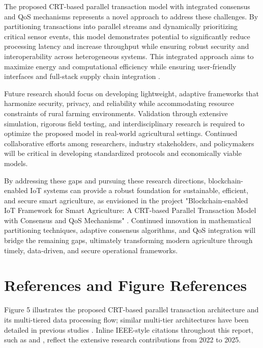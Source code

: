 \documentclass[12pt,onecolumn]{IEEEtran} %
\begin{document}
The proposed CRT-based parallel transaction model with integrated consensus and QoS mechanisms represents a novel approach to address these challenges. By partitioning transactions into parallel streams and dynamically prioritizing critical sensor events, this model demonstrates potential to significantly reduce processing latency and increase throughput while ensuring robust security and interoperability across heterogeneous systems. This integrated approach aims to maximize energy and computational efficiency while ensuring user-friendly interfaces and full-stack supply chain integration \cite{thiruvenkatasamy2025anonlinetool, singh2025blockchainandflbased}.

Future research should focus on developing lightweight, adaptive frameworks that harmonize security, privacy, and reliability while accommodating resource constraints of rural farming environments. Validation through extensive simulation, rigorous field testing, and interdisciplinary research is required to optimize the proposed model in real-world agricultural settings. Continued collaborative efforts among researchers, industry stakeholders, and policymakers will be critical in developing standardized protocols and economically viable models.

By addressing these gaps and pursuing these research directions, blockchain-enabled IoT systems can provide a robust foundation for sustainable, efficient, and secure smart agriculture, as envisioned in the project "Blockchain-enabled IoT Framework for Smart Agriculture: A CRT-based Parallel Transaction Model with Consensus and QoS Mechanisms" \cite{aliyu2023blockchainbasedsmartfarm, daund2025designofan}. Continued innovation in mathematical partitioning techniques, adaptive consensus algorithms, and QoS integration will bridge the remaining gaps, ultimately transforming modern agriculture through timely, data-driven, and secure operational frameworks.

\section*{References and Figure References}
Figure 5 illustrates the proposed CRT-based parallel transaction architecture and its multi-tiered data processing flow; similar multi-tier architectures have been detailed in previous studies \cite{thiruvenkatasamy2025anonlinetool}. Inline IEEE-style citations throughout this report, such as \cite{huang2025digitaltraceabilityin, irfan2025aniotdrivensmart} and \cite{huang2025digitaltraceabilityin, huang2025digitaltraceabilityin}, reflect the extensive research contributions from 2022 to 2025.
\end{document}
